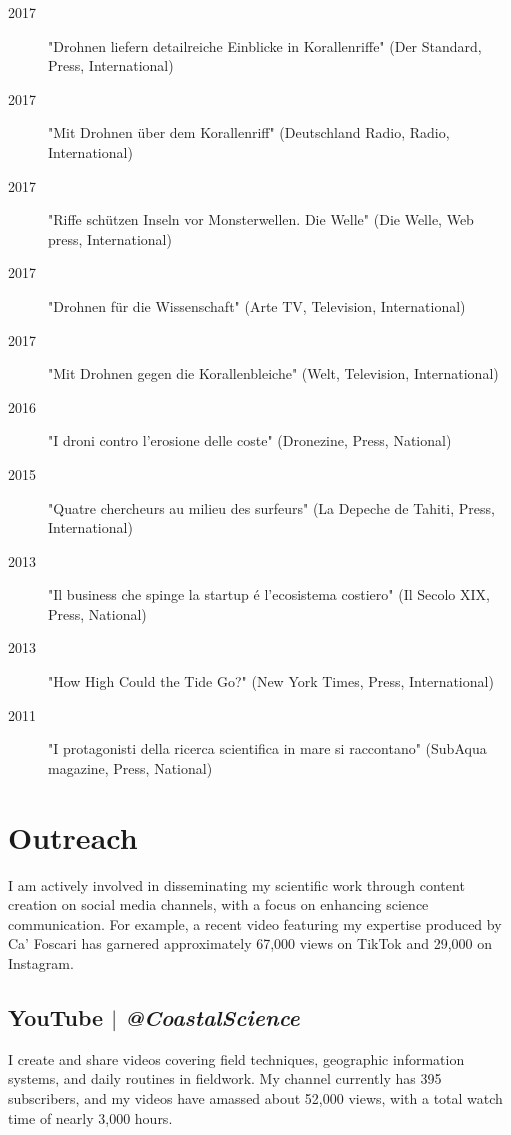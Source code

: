 \documentclass[11pt]{article}
\begin{document}
{\begin{description}
  \item [2017] "Drohnen liefern detailreiche Einblicke in Korallenriffe" (Der Standard, Press, International) 
  \item [2017] "Mit Drohnen über dem Korallenriff" (Deutschland Radio, Radio, International) 
  \item [2017] "Riffe schützen Inseln vor Monsterwellen. Die Welle" (Die Welle, Web press, International) 
  \item [2017] "Drohnen für die Wissenschaft" (Arte TV, Television, International) 
  \item [2017] "Mit Drohnen gegen die Korallenbleiche" (Welt, Television, International) 
  \item [2016] "I droni contro l’erosione delle coste" (Dronezine, Press, National) 
  \item [2015] "Quatre chercheurs au milieu des surfeurs" (La Depeche de Tahiti, Press, International) 
  \item [2013] "Il business che spinge la startup é l’ecosistema costiero" (Il Secolo XIX, Press, National) 
  \item [2013] "How High Could the Tide Go?" (New York Times, Press, International) 
  \item [2011] "I protagonisti della ricerca scientifica in mare si raccontano" (SubAqua magazine, Press, National) 
\end{description}}

\section{Outreach}
{\normalfont I am actively involved in disseminating my scientific work through content creation on social media channels, with a focus on enhancing science communication. For example, a recent video featuring my expertise produced by Ca' Foscari has garnered approximately 67,000 views on TikTok and 29,000 on Instagram.}\\

\bigskip

\subsection{YouTube $|$ {\normalfont\textit{@CoastalScience}}}
{\footnotesize I create and share videos covering field techniques, geographic information systems, and daily routines in fieldwork. My channel currently has 395 subscribers, and my videos have amassed about 52,000 views, with a total watch time of nearly 3,000 hours.}
\bigskip
\end{document}
